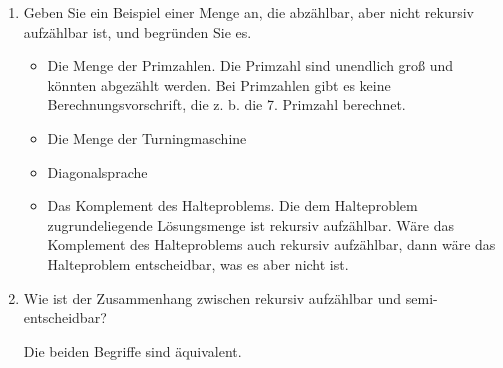 \documentclass{bschlangaul-aufgabe}
\begin{document}
\begin{enumerate}


\item Geben Sie ein Beispiel einer Menge an, die abzählbar, aber nicht
rekursiv aufzählbar ist, und begründen Sie es.

\begin{bAntwort}
\begin{itemize}
\item Die Menge der Primzahlen. Die Primzahl sind unendlich groß und
könnten abgezählt werden. Bei Primzahlen gibt es keine
Berechnungsvorschrift, die z. b. die 7. Primzahl berechnet.

\item Die Menge der Turningmaschine

\item Diagonalsprache

\item Das Komplement des Halteproblems. Die dem Halteproblem
zugrundeliegende Lösungsmenge ist rekursiv aufzählbar. Wäre das
Komplement des Halteproblems auch rekursiv aufzählbar, dann wäre das
Halteproblem entscheidbar, was es aber nicht ist.
\end{itemize}
\end{bAntwort}


\item Wie ist der Zusammenhang zwischen rekursiv aufzählbar und
semi-entscheidbar?

\begin{bAntwort}
Die beiden Begriffe sind äquivalent.
\end{bAntwort}

\end{enumerate}
\end{document}
